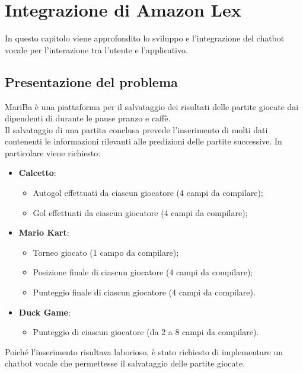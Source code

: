 
\chapter{Integrazione di Amazon Lex}
\label{cap:lex}

In questo capitolo viene approfondito lo sviluppo e l'integrazione del \gls{chatbot} vocale per l'interazione tra l'utente e l'applicativo. \\


\section{Presentazione del problema}
MariBa è una piattaforma per il salvataggio dei risultati delle partite giocate dai dipendenti di \azienda durante le 
pause pranzo e caffè. \\
Il salvataggio di una partita conclusa prevede l'inserimento di molti dati contenenti le informazioni rilevanti alle predizioni delle partite successive. 
In particolare viene richiesto: 
\begin{itemize}
	\item \textbf{Calcetto}:
	\begin{itemize}
		\item Autogol effettuati da ciascun giocatore (4 campi da compilare);
		\item Gol effettuati da ciascun giocatore (4 campi da compilare);
	\end{itemize}
	\item \textbf{Mario Kart}:
	\begin{itemize}
		\item Torneo giocato (1 campo da compilare);
		\item Posizione finale di ciascun giocatore (4 campi da compilare);
		\item Punteggio finale di ciascun giocatore (4 campi da compilare).
	\end{itemize}
	\item \textbf{Duck Game}:
	\begin{itemize}
		\item Punteggio di ciascun giocatore (da 2 a 8 campi da compilare).
	\end{itemize}
\end{itemize}
Poiché l'inserimento risultava laborioso, è stato richiesto di implementare un \gls{chatbot} vocale 
che permettesse il salvataggio delle partite giocate.
